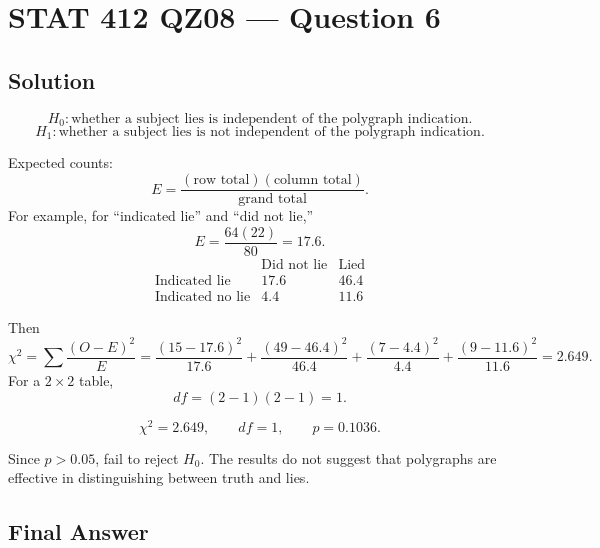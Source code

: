 \documentclass[11pt]{article}
\begin{document}
\section*{STAT 412 QZ08 --- Question 6}

\subsection*{Solution}

\[
H_0:\text{whether a subject lies is independent of the polygraph indication.}
\]
\[
H_1:\text{whether a subject lies is not independent of the polygraph indication.}
\]

Expected counts:
\[
E=\frac{(\text{row total})(\text{column total})}{\text{grand total}}.
\]
For example, for ``indicated lie'' and ``did not lie,''
\[
E=\frac{64(22)}{80}=17.6.
\]
\[
\begin{array}{c|cc}
 & \text{Did not lie} & \text{Lied}\\ \hline
\text{Indicated lie} & 17.6 & 46.4\\
\text{Indicated no lie} & 4.4 & 11.6
\end{array}
\]

Then
\[
\chi^2=\sum\frac{(O-E)^2}{E}
=\frac{(15-17.6)^2}{17.6}
+\frac{(49-46.4)^2}{46.4}
+\frac{(7-4.4)^2}{4.4}
+\frac{(9-11.6)^2}{11.6}
=2.649.
\]
For a \(2\times2\) table,
\[
df=(2-1)(2-1)=1.
\]

\[
\chi^2=2.649,\qquad df=1,\qquad p=0.1036.
\]

Since \(p>0.05\), fail to reject \(H_0\). The results do not suggest that polygraphs are effective in distinguishing between truth and lies.

\subsection*{Final Answer}

\end{document}
